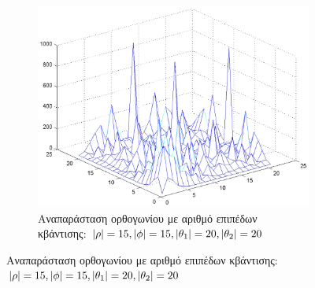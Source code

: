 \begin{figure}
        \centering
        \begin{subfigure}[b]{1\textwidth}
                \centerline{\includegraphics[scale = 0.3]{./images/examples/orthogwnio(15152020).png}}
                \caption{Αναπαράσταση ορθογωνίου με αριθμό επιπέδων κβάντισης: $\lvert\rho\rvert = 15,\lvert\phi\rvert = 15,\lvert\theta_1\rvert = 20,\lvert\theta_2\rvert = 20$}
        \end{subfigure}%
\end{figure}

